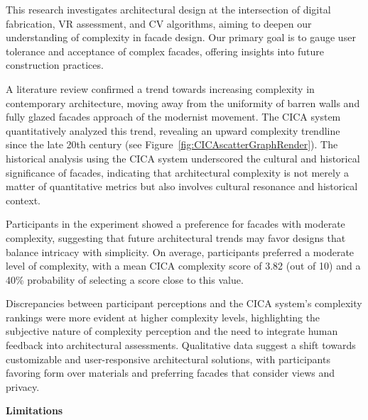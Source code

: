 


This research investigates architectural design at the intersection of digital fabrication, VR assessment, and CV algorithms, aiming to deepen our understanding of complexity in facade design.
Our primary goal is to gauge user tolerance and acceptance of complex facades, offering insights into future construction practices.

A literature review confirmed a trend towards increasing complexity in contemporary architecture, moving away from the uniformity of barren walls and fully glazed facades approach of the modernist movement.
The CICA system quantitatively analyzed this trend, revealing an upward complexity trendline since the late 20th century (see Figure~\ref{fig:CICAscatterGraphRender}).
The historical analysis using the CICA system underscored the cultural and historical significance of facades, indicating that architectural complexity is not merely a matter of quantitative metrics but also involves cultural resonance and historical context.

Participants in the experiment showed a preference for facades with moderate complexity, suggesting that future architectural trends may favor designs that balance intricacy with simplicity.
On average, participants preferred a moderate level of complexity, with a mean CICA complexity score of 3.82 (out of 10) and a 40\% probability of selecting a score close to this value.


Discrepancies between participant perceptions and the CICA system's complexity rankings were more evident at higher complexity levels, highlighting the subjective nature of complexity perception and the need to integrate human feedback into architectural assessments.
Qualitative data suggest a shift towards customizable and user-responsive architectural solutions, with participants favoring form over materials and preferring facades that consider views and privacy.

\textbf{Limitations}


